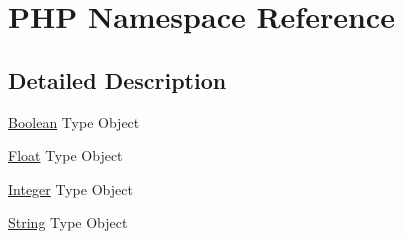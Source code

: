 \hypertarget{namespace_p_h_p}{
\section{PHP Namespace Reference}
\label{namespace_p_h_p}
}


\subsection{Detailed Description}
\hyperlink{class_boolean}{Boolean} Type Object

\hyperlink{class_float}{Float} Type Object

\hyperlink{class_integer}{Integer} Type Object

\hyperlink{class_string}{String} Type Object 

